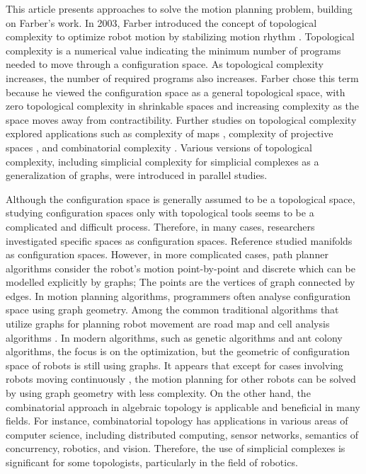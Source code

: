 \documentclass[preprint,11pt %
]{hjm1}
\theoremstyle{definition}
\begin{document}
This article presents approaches to solve the motion planning problem, building on Farber's work. In 2003, Farber introduced the concept of topological complexity to optimize robot motion by stabilizing motion rhythm \cite{Far}. Topological complexity is a numerical value indicating the minimum number of programs needed to move through a configuration space. As topological complexity increases, the number of required programs also increases. Farber chose this term because he viewed the configuration space as a general topological space, with zero topological complexity in shrinkable spaces and increasing complexity as the space moves away from contractibility.
Further studies on topological complexity explored applications such as complexity of maps \cite{Pav}, complexity of projective spaces \cite{Farproj}, and combinatorial complexity \cite{Combi}. Various versions of topological complexity, including simplicial complexity for simplicial complexes as a generalization of graphs, were introduced in parallel studies.



Although the configuration space is generally assumed to be a topological space, studying configuration spaces only with topological tools seems to be a complicated and difficult process. Therefore, in many cases, researchers investigated specific spaces as configuration spaces. Reference \cite{Mes} studied manifolds as  configuration spaces. However, in more complicated cases, path planner algorithms consider the robot's motion point-by-point and discrete which can be modelled explicitly by graphs; The points are the vertices of graph  connected by edges. In motion planning algorithms, programmers often analyse configuration space using graph geometry. Among the common traditional algorithms that utilize graphs for planning robot movement are road map and cell analysis algorithms \cite{Teja}. In modern algorithms, such as genetic algorithms \cite{Li} and ant colony algorithms, the focus is on the optimization, but the geometric of configuration space of robots is still using graphs. It appears that except for cases involving robots moving continuously \cite{5}, the motion planning for other robots can be solved by using graph geometry with less complexity.
On the other hand, the combinatorial approach in algebraic topology is applicable and beneficial in many fields. For instance, combinatorial topology has applications in various areas of computer science, including distributed computing, sensor networks, semantics of concurrency, robotics, and vision. Therefore, the use of simplicial complexes is significant for some topologists, particularly in the field of robotics.
\end{document}
